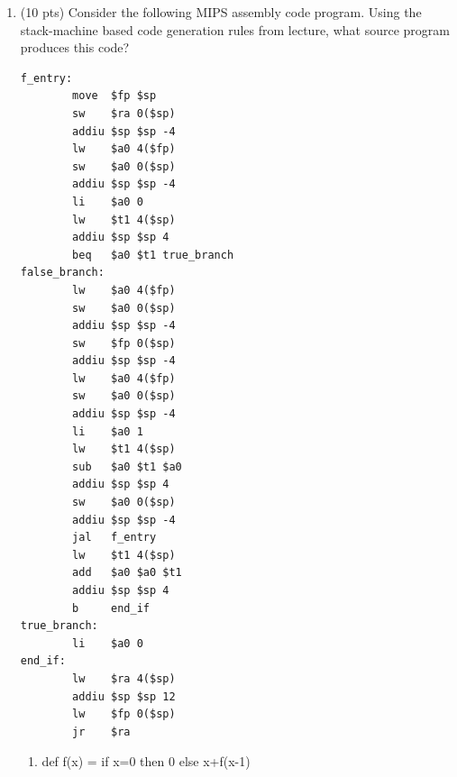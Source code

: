 \documentclass[10pt]{article}
\newcommand{\ossimple}[6]{#1,#2,#3\vdash #4 : #5,#6}
\newcommand{\osrule}[8]{\frac{#7}{\ossimple{#1}{#2}{#3}{#4}{#5}{#6}}\eqno
  \mbox{#8}}
\begin{document}
\begin{enumerate}
The result of this expression would be 10 if {\tt x} $<$ 10 or {\tt void}
if {\tt x} $\geq$ 10.

Write new operational rules for the {\tt while} construct that formalize
these alternative semantics.

$$\osrule{so}{E}{S} {while\ e_1\ loop\ e_2\ pool}{void}{S_1}
  {\begin{array}{l}
  \ossimple{so}{E}{S}{e_1}{Bool(false)}{S_1}\\
   \end{array}}{}
$$
\\ \\
$$\osrule{so}{E}{S} {while\ e_1\ loop\ e_2\ pool}{v_1}{S_4}
  {\begin{array}{l}
  \ossimple{so}{E}{S}{e_1}{Bool(true)}{S_1}\\
  \ossimple{so}{E}{S_1}{e_2}{v_1}{S_2}\\
  \ossimple{so}{E}{S_2}{e_1}{Bool(true)}{S_3}\ \ S_3 \ isn't\ the\ last\ time\ of\ while\ \\
  \ossimple{so}{E}{S_3} {while\ e_1\ loop\ e_2\ pool}{v_1}{S_4}
   \end{array}}{}
$$
\\ \\
$$\osrule{so}{E}{S} {while\ e_1\ loop\ e_2\ pool}{v_1}{S_3}
  {\begin{array}{l}
  \ossimple{so}{E}{S}{e_1}{Bool(true)}{S_1}\\
  \ossimple{so}{E}{S_1}{e_2}{v_1}{S_2}\\
  \ossimple{so}{E}{S_2}{e_1}{Bool(false)}{S_3}\\
   \end{array}}{}
$$




\item (10 pts) Consider the following MIPS assembly code program.  Using the
stack-machine based code generation rules from lecture, what source program produces this
code?
\begin{verbatim}
f_entry:
        move  $fp $sp
        sw    $ra 0($sp)
        addiu $sp $sp -4
        lw    $a0 4($fp)
        sw    $a0 0($sp)
        addiu $sp $sp -4
        li    $a0 0
        lw    $t1 4($sp)
        addiu $sp $sp 4
        beq   $a0 $t1 true_branch
false_branch:
        lw    $a0 4($fp)
        sw    $a0 0($sp)
        addiu $sp $sp -4
        sw    $fp 0($sp)
        addiu $sp $sp -4
        lw    $a0 4($fp)
        sw    $a0 0($sp)
        addiu $sp $sp -4
        li    $a0 1
        lw    $t1 4($sp)
        sub   $a0 $t1 $a0
        addiu $sp $sp 4
        sw    $a0 0($sp)
        addiu $sp $sp -4
        jal   f_entry
        lw    $t1 4($sp)
        add   $a0 $a0 $t1
        addiu $sp $sp 4
        b     end_if
true_branch:
        li    $a0 0
end_if:
        lw    $ra 4($sp)
        addiu $sp $sp 12
        lw    $fp 0($sp)
        jr    $ra
\end{verbatim}
\begin{enumerate}
 \item def f(x) = if x=0 then 0 else x+f(x-1)
\end{enumerate}


\end{enumerate}
\end{document}
